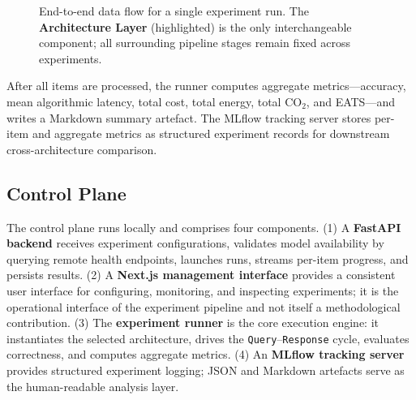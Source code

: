 \begin{figure}[h!]
\caption{End-to-end data flow for a single experiment run. The \textbf{Architecture Layer} (highlighted) is the only interchangeable component; all surrounding pipeline stages remain fixed across experiments.}
\label{fig:dataflow}
\end{figure}

After all items are processed, the runner computes aggregate metrics---accuracy, mean algorithmic latency, total cost, total energy, total CO$_2$, and EATS---and writes a Markdown summary artefact. The MLflow tracking server stores per-item and aggregate metrics as structured experiment records for downstream cross-architecture comparison.

\subsection{Control Plane}

The control plane runs locally and comprises four components. (1) A \textbf{FastAPI backend} receives experiment configurations, validates model availability by querying remote health endpoints, launches runs, streams per-item progress, and persists results. (2) A \textbf{Next.js management interface} provides a consistent user interface for configuring, monitoring, and inspecting experiments; it is the operational interface of the experiment pipeline and not itself a methodological contribution. (3) The \textbf{experiment runner} is the core execution engine: it instantiates the selected architecture, drives the \texttt{Query}--\texttt{Response} cycle, evaluates correctness, and computes aggregate metrics. (4) An \textbf{MLflow tracking server} provides structured experiment logging; JSON and Markdown artefacts serve as the human-readable analysis layer.

